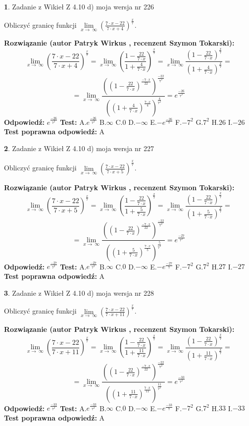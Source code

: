 \documentclass[12pt, a4paper]{article}
\theoremstyle{definition} %
\newtheorem{zad}{}
\newcommand{\zadStart}[1]{\begin{zad}#1\newline}
\newcommand{\zadStop}{\end{zad}}
\newcommand{\rozwStart}[2]{\noindent \textbf{Rozwiązanie (autor #1 , recenzent #2): }\newline}
\newcommand{\rozwStop}{\newline}
\newcommand{\odpStart}{\noindent \textbf{Odpowiedź:}\newline}
\newcommand{\odpStop}{\newline}
\newcommand{\testStart}{\noindent \textbf{Test:}\newline}
\newcommand{\testStop}{\newline}
\newcommand{\kluczStart}{\noindent \textbf{Test poprawna odpowiedź:}\newline}
\newcommand{\kluczStop}{\newline}
\begin{document}
\zadStart{Zadanie z Wikieł Z 4.10 d) moja wersja nr 226}


Obliczyć granicę funkcji  $\lim\limits_{x\to\ \infty}(\frac{7\cdot x-22}{7\cdot x+4})^{\frac{x}{7}}$.
\zadStop
\rozwStart{Patryk Wirkus}{Szymon Tokarski}
$$\lim\limits_{x\to\ \infty}(\frac{7\cdot x-22}{7\cdot x+4})^{\frac{x}{7}} = \lim\limits_{x\to\ \infty}(\frac{1-\frac{22}{7\cdot x}}{1+\frac{4}{7\cdot x}})^{\frac{x}{7}}=\lim\limits_{x\to\ \infty}\frac{(1-\frac{22}{7\cdot x})^{\frac{x}{7}}}{(1+\frac{4}{7\cdot x})^{\frac{x}{7}}}=$$
$$=\lim\limits_{x\to\ \infty}\frac{((1-\frac{22}{7\cdot x})^{\frac{-7\cdot x}{22}})^{\frac{-22}{7^{2}}}}{((1+\frac{4}{7\cdot x})^{\frac{7\cdot x}{4}})^{\frac{4}{7^{2}}}}=e^{\frac{-26}{7^{2}}}$$
\rozwStop
\odpStart
$e^{\frac{-26}{7^{2}}}$
\odpStop
\testStart
A.$e^{\frac{-26}{7^{2}}}$ B.$\infty$ C.$0$ D.$-\infty$ E.$-e^{\frac{-26}{7}}$
F.$-7^{2}$ G.$7^{2}$
H.$26$
I.$-26$
\testStop
\kluczStart
A
\kluczStop



\zadStart{Zadanie z Wikieł Z 4.10 d) moja wersja nr 227}


Obliczyć granicę funkcji  $\lim\limits_{x\to\ \infty}(\frac{7\cdot x-22}{7\cdot x+5})^{\frac{x}{7}}$.
\zadStop
\rozwStart{Patryk Wirkus}{Szymon Tokarski}
$$\lim\limits_{x\to\ \infty}(\frac{7\cdot x-22}{7\cdot x+5})^{\frac{x}{7}} = \lim\limits_{x\to\ \infty}(\frac{1-\frac{22}{7\cdot x}}{1+\frac{5}{7\cdot x}})^{\frac{x}{7}}=\lim\limits_{x\to\ \infty}\frac{(1-\frac{22}{7\cdot x})^{\frac{x}{7}}}{(1+\frac{5}{7\cdot x})^{\frac{x}{7}}}=$$
$$=\lim\limits_{x\to\ \infty}\frac{((1-\frac{22}{7\cdot x})^{\frac{-7\cdot x}{22}})^{\frac{-22}{7^{2}}}}{((1+\frac{5}{7\cdot x})^{\frac{7\cdot x}{5}})^{\frac{5}{7^{2}}}}=e^{\frac{-27}{7^{2}}}$$
\rozwStop
\odpStart
$e^{\frac{-27}{7^{2}}}$
\odpStop
\testStart
A.$e^{\frac{-27}{7^{2}}}$ B.$\infty$ C.$0$ D.$-\infty$ E.$-e^{\frac{-27}{7}}$
F.$-7^{2}$ G.$7^{2}$
H.$27$
I.$-27$
\testStop
\kluczStart
A
\kluczStop



\zadStart{Zadanie z Wikieł Z 4.10 d) moja wersja nr 228}


Obliczyć granicę funkcji  $\lim\limits_{x\to\ \infty}(\frac{7\cdot x-22}{7\cdot x+11})^{\frac{x}{7}}$.
\zadStop
\rozwStart{Patryk Wirkus}{Szymon Tokarski}
$$\lim\limits_{x\to\ \infty}(\frac{7\cdot x-22}{7\cdot x+11})^{\frac{x}{7}} = \lim\limits_{x\to\ \infty}(\frac{1-\frac{22}{7\cdot x}}{1+\frac{11}{7\cdot x}})^{\frac{x}{7}}=\lim\limits_{x\to\ \infty}\frac{(1-\frac{22}{7\cdot x})^{\frac{x}{7}}}{(1+\frac{11}{7\cdot x})^{\frac{x}{7}}}=$$
$$=\lim\limits_{x\to\ \infty}\frac{((1-\frac{22}{7\cdot x})^{\frac{-7\cdot x}{22}})^{\frac{-22}{7^{2}}}}{((1+\frac{11}{7\cdot x})^{\frac{7\cdot x}{11}})^{\frac{11}{7^{2}}}}=e^{\frac{-33}{7^{2}}}$$
\rozwStop
\odpStart
$e^{\frac{-33}{7^{2}}}$
\odpStop
\testStart
A.$e^{\frac{-33}{7^{2}}}$ B.$\infty$ C.$0$ D.$-\infty$ E.$-e^{\frac{-33}{7}}$
F.$-7^{2}$ G.$7^{2}$
H.$33$
I.$-33$
\testStop
\kluczStart
A
\kluczStop
\end{document}
